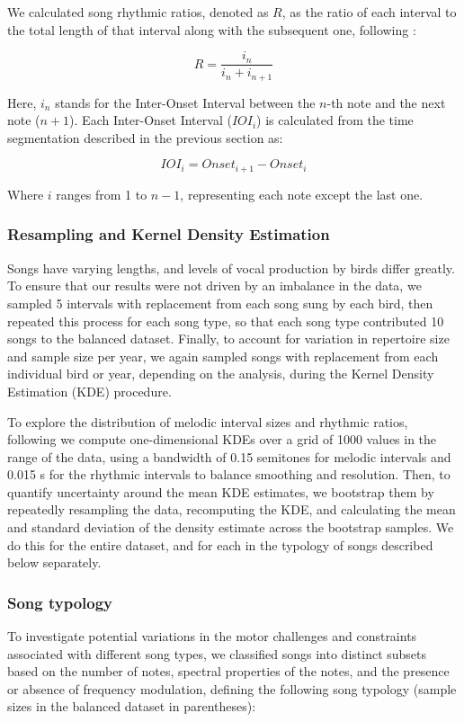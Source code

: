 We calculated song rhythmic ratios, denoted as $R$, as the ratio of each interval to the total length of that interval along with the subsequent one, following \textcite{roeske2020, xing2022}:

\begin{equation}
R = \frac{i_{n}}{i_{n} + i_{n+1}}
\end{equation}

\noindent Here, $i_{n}$ stands for the Inter-Onset Interval between the $n$-th note and the next note ($n+1$). Each Inter-Onset Interval ($IOI_i$) is calculated from the time segmentation described in the previous section as:

\begin{equation}
IOI_i = Onset_{i+1} - Onset_i
\end{equation}

\noindent Where $i$ ranges from 1 to $n-1$, representing each note except the last one.

\subsubsection{Resampling and Kernel Density Estimation}

Songs have varying lengths, and levels of vocal production by birds differ greatly. To ensure that our results were not driven by an imbalance in the data, we sampled 5 intervals with replacement from each song sung by each bird, then repeated this process for each song type, so that each song type contributed 10 songs to the balanced dataset. Finally, to account for variation in repertoire size and sample size per year, we again sampled songs with replacement from each individual bird or year, depending on the analysis, during the Kernel Density Estimation (KDE) procedure.

To explore the distribution of melodic interval sizes and rhythmic ratios, following \textcite{anglada-tort2023} we compute one-dimensional KDEs over a grid of 1000 values in the range of the data, using a bandwidth of 0.15 semitones for melodic intervals and 0.015 s for the rhythmic intervals to balance smoothing and resolution. Then, to quantify uncertainty around the mean KDE estimates, we bootstrap them by repeatedly resampling the data, recomputing the KDE, and calculating the mean and standard deviation of the density estimate across the bootstrap samples. We do this for the entire dataset, and for each in the typology of songs described below separately.


\subsubsection{Song typology}
\label{c5:typology}
To investigate potential variations in the motor challenges and constraints associated with different song types, we classified songs into distinct subsets based on the number of notes, spectral properties of the notes, and the presence or absence of frequency modulation, defining the following song typology (sample sizes in the balanced dataset in parentheses):

